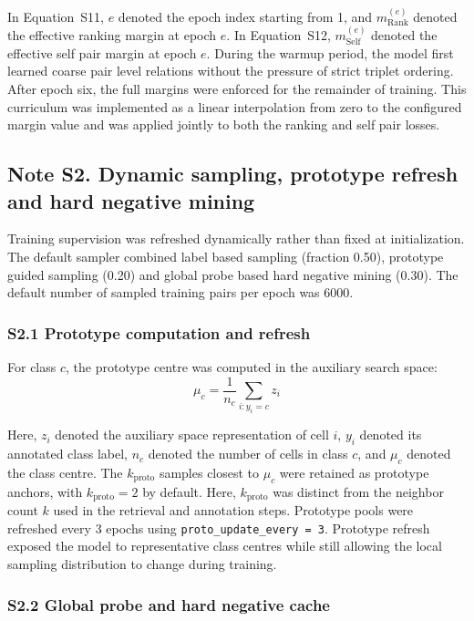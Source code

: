 \documentclass[11pt]{article}
\begin{document}
In Equation~S11, \(e\) denoted the epoch index starting from 1, and \(m_{\mathrm{Rank}}^{(e)}\) denoted the effective ranking margin at epoch \(e\). In Equation~S12, \(m_{\mathrm{Self}}^{(e)}\) denoted the effective self pair margin at epoch \(e\). During the warmup period, the model first learned coarse pair level relations without the pressure of strict triplet ordering. After epoch six, the full margins were enforced for the remainder of training. This curriculum was implemented as a linear interpolation from zero to the configured margin value and was applied jointly to both the ranking and self pair losses.

\subsection*{Note S2. Dynamic sampling, prototype refresh and hard negative mining}

Training supervision was refreshed dynamically rather than fixed at initialization. The default sampler combined label based sampling (fraction 0.50), prototype guided sampling (0.20) and global probe based hard negative mining (0.30). The default number of sampled training pairs per epoch was 6000.

\subsubsection*{S2.1 Prototype computation and refresh}

For class \(c\), the prototype centre was computed in the auxiliary search space:
\begin{equation}
\mu_c = \frac{1}{n_c}\sum_{i:y_i=c} z_i
\label{eq:prototype_mean}
\end{equation}

Here, \(z_i\) denoted the auxiliary space representation of cell \(i\), \(y_i\) denoted its annotated class label, \(n_c\) denoted the number of cells in class \(c\), and \(\mu_c\) denoted the class centre. The \(k_{\mathrm{proto}}\) samples closest to \(\mu_c\) were retained as prototype anchors, with \(k_{\mathrm{proto}}=2\) by default. Here, \(k_{\mathrm{proto}}\) was distinct from the neighbor count \(k\) used in the retrieval and annotation steps. Prototype pools were refreshed every 3 epochs using \texttt{proto\_update\_every = 3}. Prototype refresh exposed the model to representative class centres while still allowing the local sampling distribution to change during training.

\subsubsection*{S2.2 Global probe and hard negative cache}
\end{document}
